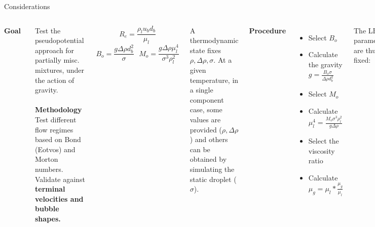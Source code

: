 \documentclass[8pt]{beamer}
\begin{document}
	\begin{frame}[t]{Considerations}
		\justifying
		
		\begin{columns}[T]
			
			\textbf{Goal}~\\
			\justifying
			
			Test the pseudopotential approach for partially misc. mixtures, under the action of gravity.\\~\\
			
			\textbf{Methodology}~\\
			Test different flow regimes based on Bond (Eotvos) and Morton numbers. Validate against \textbf{terminal velocities and bubble shapes.}
			
			\begin{equation*}
			R_e = \frac{\rho_l u_b d_b}{\mu_l}
			\end{equation*}
			\begin{equation*}
			B_o = \frac{g \Delta \rho d_b^2}{\sigma} \,\,\,\, 	M_o = \frac{g \Delta \rho \mu_l^4}{\sigma^3 
				\rho_l^2}
			\end{equation*}
			
			
			A thermodynamic state fixes $\rho, \Delta \rho, \sigma$. At a given temperature, in a single component case, some values are provided ($\rho, \Delta \rho$) and others can be obtained by simulating the static droplet ($\sigma$). \\
			
			
			\textbf{Procedure}	
			\begin{itemize}
				\item Select $B_o$
				\item Calculate the gravity $g = \frac{B_o \sigma}{\Delta \rho d_b^2}$
				\item Select $M_o$
				\item Calculate $\mu_l^4 = \frac{M_o \sigma^3 \rho_l^2}{g \Delta \rho }$
				\item Select the viscosity ratio
				\item Calculate $\mu_g = \mu_l * \frac{\mu_g}{\mu_l}$
			\end{itemize}
			
			The LBM parameters are thus fixed:

			\begin{equation*}
			\begin{split}
			\tau = \frac{\nu}{c_s^2}+ \frac{\Delta t}{2}
			\end{split}
			\end{equation*}
			
			\textbf{Try single component and then the multicomponent case.}
		\end{columns}
	\end{frame}
	
\end{document}
